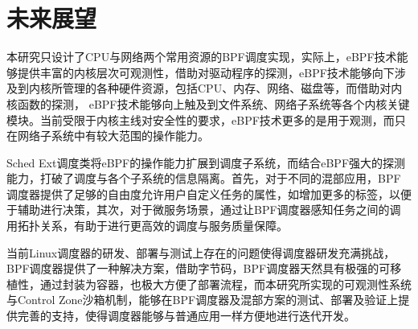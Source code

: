 \section{未来展望}

本研究只设计了CPU与网络两个常用资源的BPF调度实现，实际上，eBPF技术能够提供丰富的内核层次可观测性，借助对驱动程序的探测，eBPF技术能够向下涉及到内核所管理的各种硬件资源，包括CPU、内存、网络、磁盘等，而借助对内核函数的探测， eBPF技术能够向上触及到文件系统、网络子系统等各个内核关键模块。当前受限于内核主线对安全性的要求，eBPF技术更多的是用于观测，而只在网络子系统中有较大范围的操作能力。

Sched Ext调度类将eBPF的操作能力扩展到调度子系统，而结合eBPF强大的探测能力，打破了调度与各个子系统的信息隔离。首先，对于不同的混部应用，BPF调度器提供了足够的自由度允许用户自定义任务的属性，如增加更多的标签，以便于辅助进行决策，其次，对于微服务场景，通过让BPF调度器感知任务之间的调用拓扑关系，有助于进行更高效的调度与服务质量保障。

当前Linux调度器的研发、部署与测试上存在的问题使得调度器研发充满挑战，BPF调度器提供了一种解决方案，借助字节码，BPF调度器天然具有极强的可移植性，通过封装为容器，也极大方便了部署流程，而本研究所实现的可观测性系统与Control Zone沙箱机制，能够在BPF调度器及混部方案的测试、部署及验证上提供完善的支持，使得调度器能够与普通应用一样方便地进行迭代开发。
